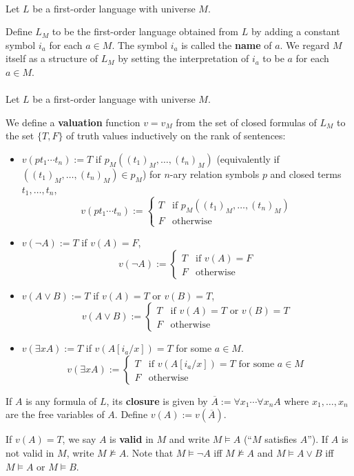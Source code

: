 \documentclass[12pt]{article}
\newlength{\myparskip}
\newenvironment{fullbox}{\begin{lrbox}{\savefullbox}\begin{minipage}{\dimexpr\textwidth-2\fboxsep\relax}\setlength{\parskip}{\myparskip}}{\end{minipage}\end{lrbox}\framebox[\textwidth]{\usebox{\savefullbox}}}
\newenvironment{pbox}[1][]{\begin{fullbox}\def\temp{#1}\ifx\temp\empty\else\paragraph{#1}\phantom{}\fi}{\end{fullbox}}
\theoremstyle{definition}
\newcommand{\<}{\langle}
\renewcommand{\>}{\rangle}
\newcommand{\clo}{\overline}
\newcommand{\keyword}{\textbf}
\begin{document}
\begin{pbox}
    Let $L$ be a first-order language with universe $M$.
    
    Define $L_M$ to be the first-order language obtained from $L$ by adding a constant symbol $i_a$ for each $a \in M$.
    The symbol $i_a$ is called the \keyword{name} of $a$.
    We regard $M$ itself as a structure of $L_M$ by setting the interpretation of $i_a$ to be $a$ for each $a \in M$.
\end{pbox}


\begin{pbox}
    Let $L$ be a first-order language with universe $M$.

    We define a \keyword{valuation} function $v = v_M$ from the set of closed formulas of $L_M$ to the set $\{T, F\}$ of truth values inductively on the rank of sentences:
    \begin{itemize}
        \item $v(p t_1 \cdots t_n) := T$ if $p_M((t_1)_M, \dots, (t_n)_M)$ (equivalently if $((t_1)_M, \dots, (t_n)_M) \in p_M$) for $n$-ary relation symbols $p$ and closed terms $t_1, \dots, t_n$,
        \[
            v(p t_1 \cdots t_n) := \begin{cases}
                T & \text{if $p_M((t_1)_M, \dots, (t_n)_M)$} \\
                F & \text{otherwise}
            \end{cases}
        \]
        \item $v(\lnot A) := T$ if $v(A) = F$,
        \[
            v(\lnot A) := \begin{cases}
                T & \text{if $v(A) = F$} \\
                F & \text{otherwise}
            \end{cases}
        \]
        \item $v(A \lor B) := T$ if $v(A) = T$ or $v(B) = T$,
        \[
            v(A \lor B) := \begin{cases}
                T & \text{if $v(A) = T$ or $v(B) = T$} \\
                F & \text{otherwise}
            \end{cases}
        \]
        \item $v(\exists x A) := T$ if $v(A[i_a/x]) = T$ for some $a \in M$.
        \[
            v(\exists x A) := \begin{cases}
                T & \text{if $v(A[i_a/x]) = T$ for some $a \in M$} \\
                F & \text{otherwise}
            \end{cases}
        \]
    \end{itemize}

    If $A$ is any formula of $L$, its \keyword{closure} is given by $\clo{A} := \forall x_1 \cdots \forall x_n A$ where $x_1, \dots, x_n$ are the free variables of $A$.
    Define $v(A) := v(\clo{A})$.

    If $v(A) = T$, we say $A$ is \keyword{valid} in $M$ and write $M \vDash A$ (``$M$ satisfies $A$'').
    If $A$ is not valid in $M$, write $M \nvDash A$.
    Note that $M \vDash \lnot A$ iff $M \nvDash A$ and $M \vDash A \lor B$ iff $M \vDash A$ or $M \vDash B$.
\end{pbox}
\end{document}
